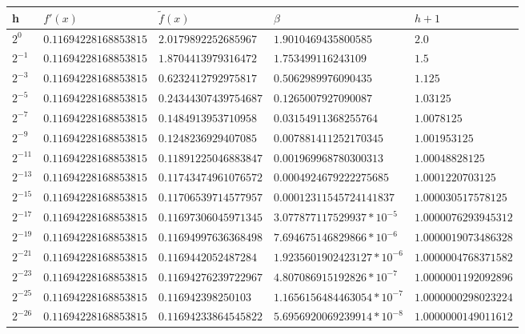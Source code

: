 \documentclass{article}
\begin{document}
\begin{longtable}{|p{}|p{}|p{}|p{4cm}|p{}|} \hline
  \textbf{h} & \textbf{$f'(x)$} & \textbf{$\widetilde{f}(x)$} & $\beta$ & $h+1$ \\
  \hline
  $2^{0}$ & $0.11694228168853815 $ & $2.0179892252685967 $ & $ 1.9010469435800585$ & $2.0 $ \\
  \hline
  $2^{-1}$ & $ 0.11694228168853815$ & $ 1.8704413979316472$ & $ 1.753499116243109$ & $ 1.5$ \\
  \hline
  $2^{-3}$ & $ 0.11694228168853815$ & $ 0.6232412792975817$ & $ 0.5062989976090435$ & $ 1.125$ \\
  \hline
  $2^{-5}$ & $ 0.11694228168853815$ & $ 0.24344307439754687$ & $ 0.1265007927090087$ & $ 1.03125$ \\
  \hline
  $2^{-7}$ & $0.11694228168853815 $ & $ 0.1484913953710958$ & $ 0.03154911368255764$ & $ 1.0078125$ \\
  \hline
  $2^{-9}$ & $0.11694228168853815 $ & $ 0.1248236929407085$ & $ 0.007881411252170345$ & $ 1.001953125$ \\
  \hline
  $2^{-11}$ & $0.11694228168853815 $ & $ 0.11891225046883847$ & $ 0.001969968780300313$ & $ 1.00048828125$ \\
  \hline
  $2^{-13}$ & $ 0.11694228168853815$ & $ 0.11743474961076572$ & $ 0.0004924679222275685$ & $ 1.0001220703125$ \\
  \hline
  $2^{-15}$ & $0.11694228168853815 $ & $0.11706539714577957 $ & $ 0.00012311545724141837$ & $ 1.000030517578125$ \\
  \hline
  $2^{-17}$ & $0.11694228168853815 $ & $ 0.11697306045971345$ & $ 3.077877117529937*10^{-5}$ & $ 1.0000076293945312$ \\
  \hline
  $2^{-19}$ & $0.11694228168853815 $ & $ 0.11694997636368498$ & $ 7.694675146829866*10^{-6}$ & $ 1.0000019073486328$ \\
  \hline
  $2^{-21}$ & $ 0.11694228168853815$ & $ 0.1169442052487284$ & $ 1.9235601902423127*10^{-6}$ & $ 1.0000004768371582$ \\
  \hline
  $2^{-23}$ & $0.11694228168853815 $ & $ 0.11694276239722967$ & $ 4.807086915192826*10^{-7}$ & $ 1.0000001192092896$ \\
  \hline
  $2^{-25}$ & $ 0.11694228168853815$ & $ 0.116942398250103$ & $ 1.1656156484463054*10^{-7}$ & $ 1.0000000298023224$ \\
  \hline
  $2^{-26}$ & $0.11694228168853815 $ & $ 0.11694233864545822$ & $ 5.6956920069239914*10^{-8}$ & $ 1.0000000149011612$ \\

\end{longtable}
\end{document}
